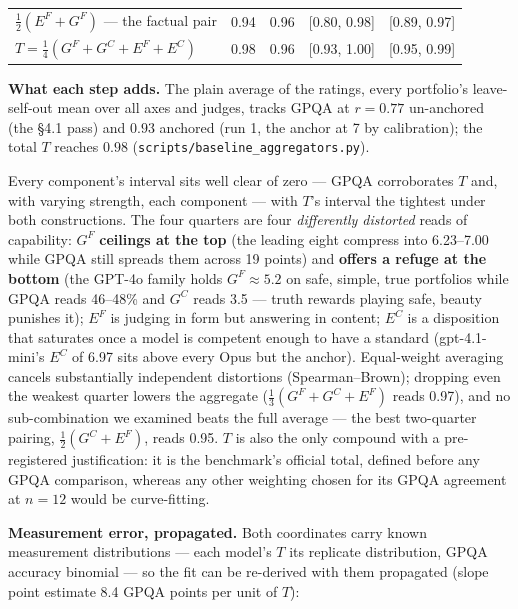 \documentclass{article}
\begin{document}
\begin{table}[H]
\begin{center}
{\begin{tabular}{@{}lrrll@{}}
\(\tfrac12(E^{F}+G^{F})\) --- the factual pair &\cellcolor[HTML]{162875}\textcolor[HTML]{EEF3F8}{0.94}&\cellcolor[HTML]{11246B}\textcolor[HTML]{EEF3F8}{0.96}& {[}0.80, 0.98{]} & {[}0.89, 0.97{]}  \\
\(T = \tfrac14(G^{F}+G^{C}+E^{F}+E^{C})\) &\cellcolor[HTML]{0D2162}\textcolor[HTML]{EEF3F8}{0.98}&\cellcolor[HTML]{11246B}\textcolor[HTML]{EEF3F8}{0.96}& {[}0.93, 1.00{]} & {[}0.95, 0.99{]}  \\
\bottomrule
\end{tabular}}
\end{center}
\end{table}

\textbf{What each step adds.} The plain average of the ratings, every portfolio's leave-self-out mean over all axes and judges, tracks GPQA at \(r = 0.77\) un-anchored (the \S{}4.1 pass) and \(0.93\) anchored (run 1, the anchor at 7 by calibration); the total \(T\) reaches \(0.98\) (\texttt{scripts/baseline\_\allowbreak{}aggregators.py}).

Every component's interval sits well clear of zero --- GPQA corroborates \(T\) and, with varying strength, each component --- with \(T\)'s interval the tightest under both constructions. The four quarters are four \emph{differently distorted} reads of capability: \(G^{F}\) \textbf{ceilings at the top} (the leading eight compress into 6.23--7.00 while GPQA still spreads them across 19 points) and \textbf{offers a refuge at the bottom} (the GPT-4o family holds \(G^{F}\approx5.2\) on safe, simple, true portfolios while GPQA reads 46--48\% and \(G^{C}\) reads 3.5 --- truth rewards playing safe, beauty punishes it); \(E^{F}\) is judging in form but answering in content; \(E^{C}\) is a disposition that saturates once a model is competent enough to have a standard (gpt-4.1-mini's \(E^{C}\) of 6.97 sits above every Opus but the anchor). Equal-weight averaging cancels substantially independent distortions (Spearman--Brown); dropping even the weakest quarter lowers the aggregate (\(\tfrac13(G^{F}+G^{C}+E^{F})\) reads 0.97), and no sub-combination we examined beats the full average --- the best two-quarter pairing, \(\tfrac12(G^{C}+E^{F})\), reads 0.95. \(T\) is also the only compound with a pre-registered justification: it is the benchmark's official total, defined before any GPQA comparison, whereas any other weighting chosen for its GPQA agreement at \(n = 12\) would be curve-fitting.

\textbf{Measurement error, propagated.} Both coordinates carry known measurement distributions --- each model's \(T\) its replicate distribution, GPQA accuracy binomial --- so the fit can be re-derived with them propagated (slope point estimate 8.4 GPQA points per unit of \(T\)):
\end{document}
